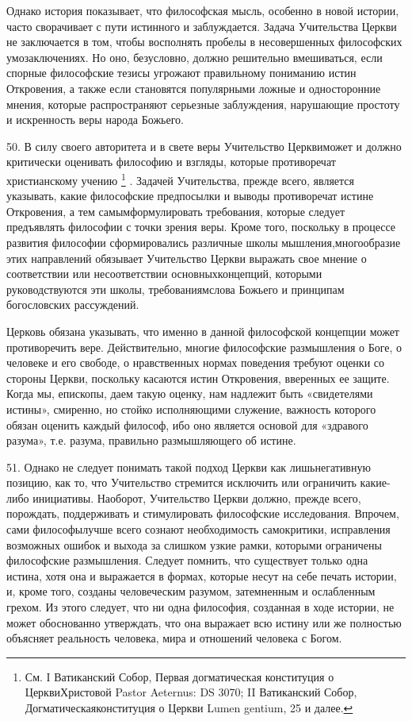 \documentclass[a5paper,10pt]{article}
\begin{document}
Однако история показывает, что философская мысль, особенно в новой истории,
часто сворачивает с пути истинного и заблуждается. Задача Учительства Церкви не
заключается в том, чтобы восполнять пробелы в несовершенных философских
умозаключениях. Но оно, безусловно, должно решительно вмешиваться, если спорные
философские тезисы угрожают правильному пониманию истин Откровения, а также
если становятся популярными ложные и односторонние мнения, которые
распространяют серьезные заблуждения, нарушающие простоту и искренность веры
народа Божьего.

50. В силу своего авторитета и в свете веры Учительство Церквиможет и должно
критически оценивать философию и взгляды, которые противоречат христианскому
учению \footnote{См. I Ватиканский Собор, Первая догматическая конституция о
ЦерквиХристовой Pastor Aeternus: DS 3070; II Ватиканский Собор,
Догматическаяконституция о Церкви Lumen gentium, 25 и далее.}  . Задачей
Учительства, прежде всего, является указывать, какие философские предпосылки и
выводы противоречат истине Откровения, а тем самымформулировать требования,
которые следует предъявлять философии с точки зрения веры. Кроме того,
поскольку в процессе развития философии сформировались различные школы
мышления,многообразие этих направлений обязывает Учительство Церкви выражать
свое мнение о соответствии или несоответствии основныхконцепций, которыми
руководствуются эти школы, требованиямслова Божьего и принципам богословских
рассуждений.

Церковь обязана указывать, что именно в данной философской концепции может
противоречить вере. Действительно, многие философские размышления о Боге, о
человеке и его свободе, о нравственных нормах поведения требуют оценки со
стороны Церкви, поскольку касаются истин Откровения, вверенных ее защите. Когда
мы, епископы, даем такую оценку, нам надлежит быть «свидетелями истины»,
смиренно, но стойко исполняющими служение, важность которого обязан оценить
каждый философ, ибо оно является основой для «здравого разума», т.е. разума,
правильно размышляющего об истине.

51. Однако не следует понимать такой подход Церкви как лишьнегативную позицию,
как то, что Учительство стремится исключить или ограничить какие-либо
инициативы. Наоборот, Учительство Церкви должно, прежде всего, порождать,
поддерживать и стимулировать философские исследования. Впрочем, сами
философылучше всего сознают необходимость самокритики, исправления возможных
ошибок и выхода за слишком узкие рамки, которыми ограничены философские
размышления. Следует помнить, что существует только одна истина, хотя она и
выражается в формах, которые несут на себе печать истории, и, кроме того,
созданы человеческим разумом, затемненным и ослабленным грехом. Из этого
следует, что ни одна философия, созданная в ходе истории, не может обоснованно
утверждать, что она выражает всю истину или же полностью объясняет реальность
человека, мира и отношений человека с Богом.
\end{document}
